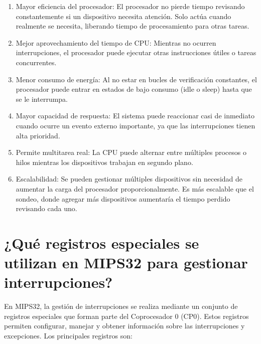\documentclass{article}
\begin{document}
\begin{enumerate}
\item Mayor eficiencia del procesador: El procesador no pierde tiempo revisando constantemente si un dispositivo necesita atención. Solo actúa cuando realmente se necesita, liberando tiempo de procesamiento para otras tareas.
\item Mejor aprovechamiento del tiempo de CPU: Mientras no ocurren interrupciones, el procesador puede ejecutar otras instrucciones útiles o tareas concurrentes.
\item Menor consumo de energía: Al no estar en bucles de verificación constantes, el procesador puede entrar en estados de bajo consumo (idle o sleep) hasta que se le interrumpa.
\item Mayor capacidad de respuesta: El sistema puede reaccionar casi de inmediato cuando ocurre un evento externo importante, ya que las interrupciones tienen alta prioridad.
\item Permite multitarea real: La CPU puede alternar entre múltiples procesos o hilos mientras los dispositivos trabajan en segundo plano.
\item Escalabilidad: Se pueden gestionar múltiples dispositivos sin necesidad de aumentar la carga del procesador proporcionalmente. Es más escalable que el sondeo, donde agregar más dispositivos aumentaría el tiempo perdido revisando cada uno.
\end{enumerate}

\section{¿Qué registros especiales se utilizan en MIPS32 para gestionar interrupciones?}

En MIPS32, la gestión de interrupciones se realiza mediante un conjunto de registros especiales que forman parte del Coprocesador 0 (CP0). Estos registros permiten configurar, manejar y obtener información sobre las interrupciones y excepciones. Los principales registros son:
\end{document}
